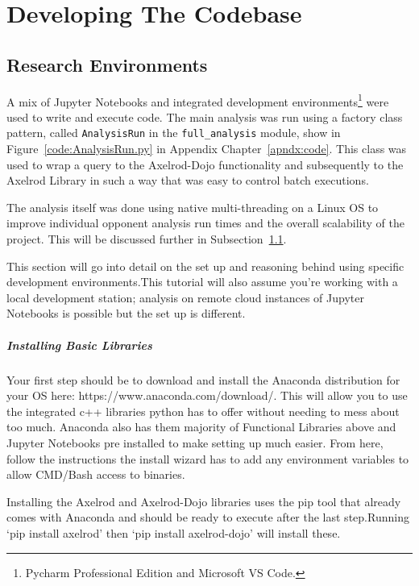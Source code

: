 \chapter{Developing The Codebase}\label{ch:developingthecodebase}


\section{Research Environments}\label{subsec:settingUpAResearchEnvironment}
A mix of Jupyter Notebooks and integrated development environments\footnote{Pycharm Professional Edition and Microsoft VS Code.} were used to write and execute code.
The main analysis was run using a factory class pattern, called \texttt{AnalysisRun} in the \texttt{full_analysis} module, show in Figure~\ref{code:AnalysisRun.py} in Appendix Chapter~\ref{apndx:code}.
This class was used to wrap a query to the Axelrod-Dojo functionality and subsequently to the Axelrod Library in such a way that was easy to control batch executions.

The analysis itself was done using native multi-threading on a Linux OS to improve individual opponent analysis run times and the overall scalability of the project.
This will be discussed further in Subsection~\ref{subsec:settingUpAResearchEnvironment}.

This section will go into detail on the set up and reasoning behind using specific development environments.This tutorial will also assume you're working with a local development station;
analysis on remote cloud instances of Jupyter Notebooks is possible but the set up is different.

\paragraph{Installing Basic Libraries}
Your first step should be to download and install the Anaconda distribution for your OS here: https://www.anaconda.com/download/.
This will allow you to use the integrated c++ libraries python has to offer without needing to mess about too much.
Anaconda also has them majority of Functional Libraries above and Jupyter Notebooks pre installed to make setting up much easier.
From here, follow the instructions the install wizard has to add any environment variables to allow CMD/Bash access to binaries.

Installing the Axelrod and Axelrod-Dojo libraries uses the pip tool that already comes with Anaconda and should be ready to execute after the last step.Running `pip install axelrod' then `pip install axelrod-dojo' will install these.

